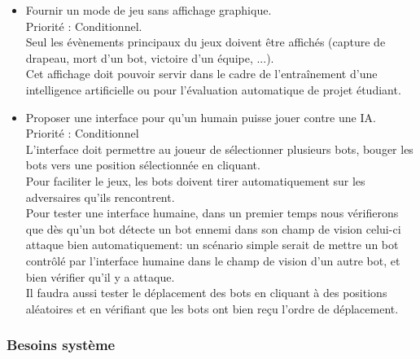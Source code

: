 \begin{itemize}
        \item Fournir un mode de jeu sans affichage graphique. \\
            Priorité : Conditionnel.\\
            Seul les évènements principaux du jeux doivent être affichés (capture de drapeau, mort d'un bot, victoire d'un équipe, ...).\\
            Cet affichage doit pouvoir servir dans le cadre de l'entraînement d'une intelligence artificielle ou pour l'évaluation automatique de projet étudiant.\\

            
        \item Proposer une interface pour qu'un humain puisse jouer contre une IA. \\
            Priorité : Conditionnel \\
            L'interface doit permettre au joueur de sélectionner plusieurs bots, bouger les bots vers une position sélectionnée en cliquant. \\
            Pour faciliter le jeux, les bots doivent tirer automatiquement sur les adversaires qu'ils rencontrent. \\
            Pour tester une interface humaine, dans un premier temps nous vérifierons que dès qu'un bot détecte un bot ennemi dans son champ de vision celui-ci attaque bien automatiquement: un scénario simple serait de mettre un bot contrôlé par l'interface humaine dans le champ de vision d'un autre bot, et bien vérifier qu'il y a attaque.\\
            Il faudra aussi tester le déplacement des bots en cliquant à des positions aléatoires et en vérifiant que les bots ont bien reçu l'ordre de déplacement. \\ 

    \end{itemize}

\subsubsection{Besoins système}
    
